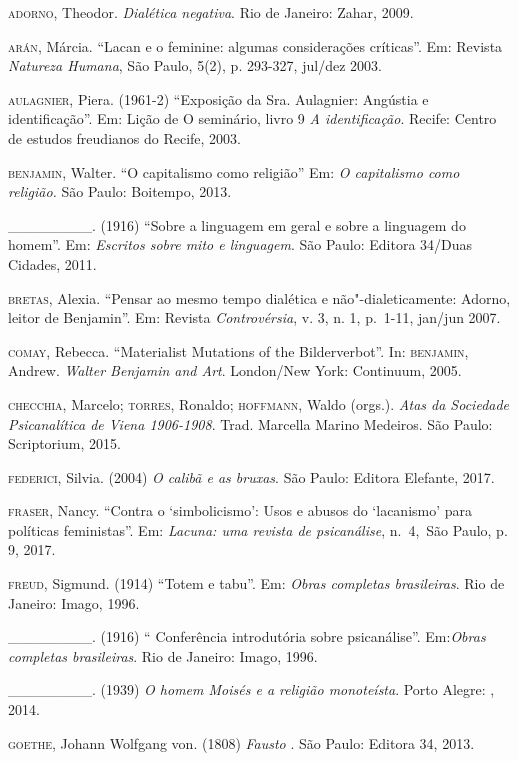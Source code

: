 \begin{Parskip}
\textsc{adorno}, Theodor. \emph{Dialética negativa}. Rio de Janeiro: Zahar, 2009.

\textsc{arán}, Márcia. ``Lacan e o feminine: algumas considerações críticas''. Em:
Revista \emph{Natureza Humana}, São Paulo, 5(2), p. 293-327, jul/dez 2003.

\textsc{aulagnier}, Piera. (1961-2) ``Exposição da Sra. Aulagnier: Angústia e
identificação''. Em: Lição  de O seminário, livro 9 \emph{A
identificação}. Recife: Centro de estudos freudianos do Recife, 2003.

\textsc{benjamin}, Walter. ``O capitalismo como religião'' Em: \emph{O capitalismo
como religião.} São Paulo: Boitempo, 2013.

\_\_\_\_\_\_\_\_. (1916) ``Sobre a linguagem em geral e sobre a linguagem
do homem''. Em: \emph{Escritos sobre mito e linguagem}. São Paulo: Editora 34/Duas Cidades, 2011.

\textsc{bretas}, Alexia. ``Pensar ao mesmo tempo dialética e não"-dialeticamente:
Adorno, leitor de Benjamin''. Em: Revista \emph{Controvérsia}, v. 3, n. 1, p.~1-11,
jan/jun 2007.

\textsc{comay}, Rebecca. ``Materialist Mutations of the Bilderverbot''. In: \textsc{benjamin},
Andrew. \emph{Walter Benjamin and Art}. London/New York: Continuum, 2005.

\textsc{checchia}, Marcelo; \textsc{torres}, Ronaldo; \textsc{hoffmann},
Waldo (orgs.). \emph{Atas da Sociedade Psicanalítica de Viena 1906-1908}. Trad. Marcella
Marino Medeiros. São Paulo: Scriptorium, 2015.

\textsc{federici}, Silvia. (2004) \emph{O calibã e as bruxas}. São Paulo: Editora Elefante, 2017.

\textsc{fraser}, Nancy. ``Contra o `simbolicismo': Usos e abusos do `lacanismo' para
políticas feministas''. Em: \emph{Lacuna: uma revista de psicanálise},
n.~4,~São Paulo, p. 9, 2017.

\textsc{freud}, Sigmund. (1914) ``Totem e tabu''. Em: \emph{Obras completas brasileiras}.
Rio de Janeiro: Imago, 1996.

\_\_\_\_\_\_\_\_. (1916) `` Conferência introdutória sobre psicanálise''.
Em:\emph{Obras completas brasileiras}. Rio de Janeiro: Imago, 1996.

\_\_\_\_\_\_\_\_. (1939) \emph{O homem Moisés e a religião monoteísta}.
Porto Alegre: , 2014.

\textsc{goethe}, Johann Wolfgang von. (1808) \emph{Fausto }. São Paulo: Editora 34, 2013.


\end{Parskip}
